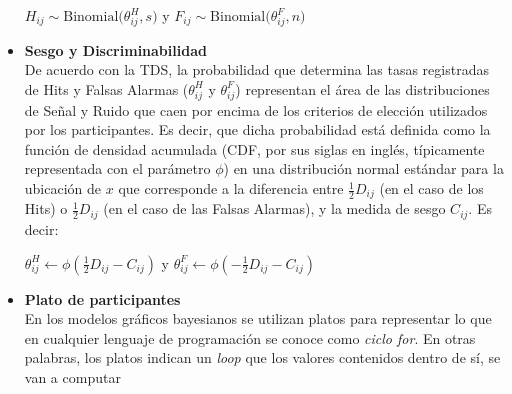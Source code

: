 \begin{itemize}
\begin{center}
$H_{ij}\sim \mathrm{Binomial}\bigl(\theta^H_{ij}, s)$
y
$F_{ij}\sim \mathrm{Binomial}\bigl(\theta^F_{ij}, n)$\\
\end{center}


\item \textbf{Sesgo y Discriminabilidad}\\

De acuerdo con la TDS, la probabilidad que determina las tasas registradas de Hits y Falsas Alarmas ($\theta^H_{ij}$ y $\theta^F_{ij}$) representan el área de las distribuciones de Señal y Ruido que caen por encima de los criterios de elección utilizados por los participantes. Es decir, que dicha probabilidad está definida como la función de densidad acumulada (CDF, por sus siglas en inglés, típicamente representada con el parámetro $\phi$) en una distribución normal estándar para la ubicación de $x$ que corresponde a la diferencia entre $\frac{1}{2}D_{ij}$ (en el caso de los Hits) o $\frac{1}{2}D_{ij}$ (en el caso de las Falsas Alarmas), y la medida de sesgo $C_{ij}$. Es decir:\\

\begin{center}
$\theta^H_{ij}\gets \phi (\frac{1}{2}D_{ij}-C_{ij})$
y
$\theta^F_{ij}\gets \phi (-\frac{1}{2}D_{ij}-C_{ij})$\\
\end{center}

\CONSIDERAR \AGREGAR \UNA \FIGURA \ILUSTRATIVA

\item \textbf{Plato de participantes}\\

En los modelos gráficos bayesianos se utilizan platos para representar lo que en cualquier lenguaje de programación se conoce como \textit{ciclo for}. En otras palabras, los platos indican un \textit{loop} que los valores contenidos dentro de sí, se van a computar  


\end{itemize}
